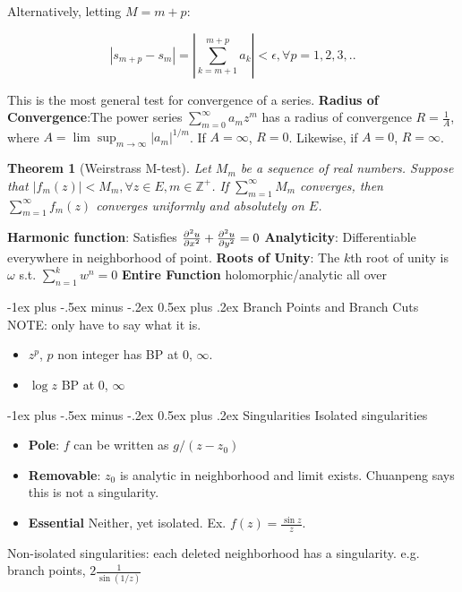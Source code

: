 \documentclass{article}
\makeatletter
\newtheorem{theorem}{Theorem}[section]
\theoremstyle{definition}
\renewcommand{\section}{\@startsection{section}{1}{0mm}%
	{-1ex plus -.5ex minus -.2ex}%
	{0.5ex plus .2ex}%
	{\normalfont\large\bfseries}}
\makeatother
\begin{document}
\begin{multicols}{3}
Alternatively, letting $M = m+p$:

$$|s_{m+p} - s_m| = \left|\sum_{k=m+1}^{m+p}a_k\right| < \epsilon, \forall p = 1,2,3,..$$

This is the most general test for convergence of a series. 
\textbf{Radius of Convergence}:The power series $\sum_{m=0}^\infty a_m z^m$ has a radius of convergence $R = \frac{1}{A}$, where $A =\lim\sup_{m \to \infty } |a_m|^{1/m}$. If $A = \infty$, $R = 0$. Likewise, if $A=0$, $R = \infty$.

\begin{theorem}[Weirstrass M-test]
	Let $M_m$ be a sequence of real numbers. Suppose that $|f_m(z)| < M_m, \forall z \in E, m\in \mathbb{Z}^+$.  If $\sum_{m=1}^\infty M_m$ converges, then $\sum_{m=1}^\infty f_m(z)$ converges uniformly and absolutely on $E$. 
\end{theorem}
 
\textbf{Harmonic function}: Satisfies $\pdv{^2u}{x^2} + \pdv{^2u}{y^2} = 0$
\textbf{Analyticity}: Differentiable everywhere in neighborhood of point.
\textbf{Roots of Unity}: The $k$th root of unity is $\omega$ s.t. $\sum_{n=1}^{k} w^n =0$
\textbf{Entire Function} holomorphic/analytic all over 


\section{Branch Points and Branch Cuts}
NOTE: only have to say what it is. 
\begin{itemize}
	\item $z^p$, $p$ non integer has BP at 0, $\infty$.
	\item $\log z$ BP at 0, $\infty$
\end{itemize}
\section{Singularities}
Isolated singularities
\begin{itemize}
	\item \textbf{Pole}: $f$ can be written as $g/(z-z_0)$
	\item \textbf{Removable}: $z_0$ is analytic in neighborhood and limit exists. Chuanpeng says this is not a singularity.
	\item \textbf{Essential} Neither, yet isolated. Ex. $f(z) = \frac{\sin z}{z}$.
\end{itemize}
Non-isolated singularities: each deleted neighborhood has a singularity. e.g. branch points, $2\frac{1}{\sin(1/z)}$


\end{multicols}
\end{document}

